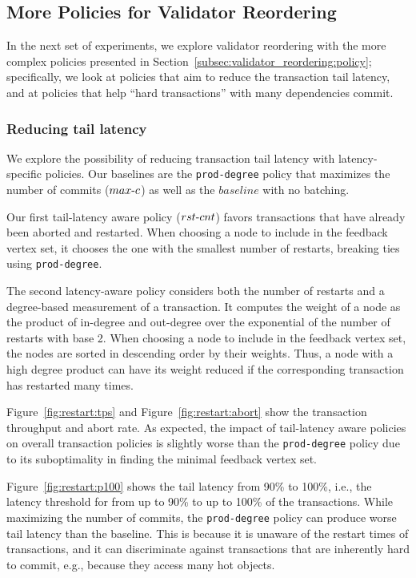 
\subsection{More Policies for Validator Reordering}

In the next set of experiments, we explore validator reordering with the more complex policies presented in Section~\ref{subsec:validator_reordering:policy}; specifically, we look at policies that aim to reduce the transaction tail latency, and at policies that help ``hard transactions'' with many dependencies commit.


\subsubsection{Reducing tail latency}

We explore the possibility of reducing transaction tail latency with latency-specific policies. Our baselines are the \texttt{prod-degree} policy that maximizes the number of commits ($max\hbox{-}c$) as well as the $baseline$ with no batching. 

Our first tail-latency aware policy ($rst\hbox{-}cnt$) favors transactions that have already been aborted and restarted. When choosing a node to include in the feedback vertex set, it chooses the one with the smallest number of restarts, breaking ties using \texttt{prod-degree}.

The second latency-aware policy considers both the number of restarts and a degree-based measurement of a transaction. It computes the weight of a node as the product of in-degree and out-degree over the exponential of the number of restarts with base 2. When choosing a node to include in the feedback vertex set, the nodes are sorted in descending order by their weights. Thus, a node with a high degree product can have its weight reduced if the corresponding transaction has restarted many times.

Figure~\ref{fig:restart:tps} and Figure~\ref{fig:restart:abort} show the transaction throughput and abort rate. As expected, the impact of tail-latency aware policies on overall transaction policies is slightly worse than the \texttt{prod-degree} policy due to its suboptimality in finding the minimal feedback vertex set.

Figure~\ref{fig:restart:p100} shows the tail latency from 90\% to 100\%, i.e., the latency threshold for from up to 90\% to up to 100\% of the transactions. While maximizing the number of commits, the \texttt{prod-degree} policy can produce worse tail latency than the baseline. This is because it is unaware of the restart times of transactions, and it can discriminate against transactions that are inherently hard to commit, e.g., because they access many hot objects.

